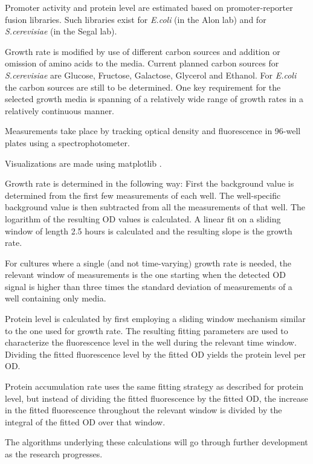 \documentclass[a4page,notitlepage]{article}
\begin{document}
Promoter activity and protein level are estimated based on promoter-reporter fusion libraries.
Such libraries exist for \emph{E.coli} (in the Alon lab) and for \emph{S.cerevisiae} (in the Segal lab).

Growth rate is modified by use of different carbon sources and addition or omission of amino acids to the media.
Current planned carbon sources for \emph{S.cerevisiae} are Glucose, Fructose, Galactose, Glycerol and Ethanol.
For \emph{E.coli} the carbon sources are still to be determined.
One key requirement for the selected growth media is spanning of a relatively wide range of growth rates in a relatively continuous manner.

Measurements take place by tracking optical density and fluorescence in 96-well plates using a spectrophotometer.

Visualizations are made using matplotlib \parencite{Hunter2007}.

Growth rate is determined in the following way:
First the background value is determined from the first few measurements of each well.
The well-specific background value is then subtracted from all the measurements of that well.
The logarithm of the resulting OD values is calculated.
A linear fit on a sliding window of length 2.5 hours is calculated and the resulting slope is the growth rate.

For cultures where a single (and not time-varying) growth rate is needed, the relevant window of measurements is the one starting when the detected OD signal is higher than three times the standard deviation of measurements of a well containing only media.

Protein level is calculated by first employing a sliding window mechanism similar to the one used for growth rate.
The resulting fitting parameters are used to characterize the fluorescence level in the well during the relevant time window.
Dividing the fitted fluorescence level by the fitted OD yields the protein level per OD.

Protein accumulation rate uses the same fitting strategy as described for protein level, but instead of dividing the fitted fluorescence by the fitted OD, the increase in the fitted fluorescence throughout the relevant window is divided by the integral of the fitted OD over that window.

The algorithms underlying these calculations will go through further development as the research progresses.
\printbibliography
\end{document}
